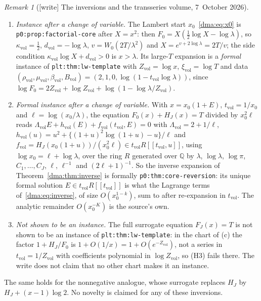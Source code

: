 \documentclass[11pt,letterpaper]{article}
\theoremstyle{remark}\newtheorem{remark}[theorem]{Remark}
\newcommand{\file}[1]{\nolinkurl{#1}}
\begin{document}
\begin{remark}[{[write]} The inversions and the transseries volume, 7~October 2026]
\begin{enumerate}[label=(\alph*)]
 most $\delta_J(x)$ for a suitable $C_J$; \file{p0:thm:staircase}(1) and the
 monotonicity of the ceiling give~\eqref{dma:eq:ceiling} for large $T$. Since
 $\nu_{\mathcal A}(\log a_n)=n$, the same bound gives the threshold-sample
 assertion, and \file{p0:thm:staircase}(3) adds that
 $n=\lfloor x_J(\log a_n)+\tfrac12\rfloor$ for all large $n$, which the source
 does not state.
\item \emph{Instance after a change of variable.} The Lambert start
 $x_0$~\eqref{dma:eq:x0} is \file{p0:prop:factorial-core} after $X=x^2$: then
 $F_0=X(\tfrac12\log X-\log\lambda)$, so $\kappa_{\mathrm{vol}}=\tfrac12$,
 $d_{\mathrm{vol}}=-\log\lambda$, $v=W_0(2T/\lambda^2)$ and
 $X=e^{v+2\log\lambda}=2T/v$; the side condition
 $\kappa_{\mathrm{vol}}\log X+d_{\mathrm{vol}}>0$ is $x>\lambda$. Its large-$T$
 expansion is a \emph{formal} instance of \file{plt:thm:lw-template} with
 $Z_{\mathrm{vol}}=\log x$, $\xi_{\mathrm{vol}}=\log T$ and data
 $(\rho_{\mathrm{vol}},\mu_{\mathrm{vol}},\beta_{\mathrm{vol}},B_{\mathrm{vol}})=(2,1,0,\log(1-t_{\mathrm{vol}}\log\lambda))$,
 since $\log F_0=2Z_{\mathrm{vol}}+\log Z_{\mathrm{vol}}+\log(1-\log\lambda/Z_{\mathrm{vol}})$.
\item \emph{Formal instance after a change of variable.} With $x=x_0(1+E)$,
 $t_{\mathrm{vol}}=1/x_0$ and $\ell=\log(x_0/\lambda)$, the equation
 $F_0(x)+H_J(x)=T$ divided by $x_0^2\ell$ reads
 $\Lambda_{\mathrm{vol}}E+h_{\mathrm{vol}}(E)+f_{\mathrm{vol}}(t_{\mathrm{vol}},E)=0$
 with $\Lambda_{\mathrm{vol}}=2+1/\ell$,
 $h_{\mathrm{vol}}(u)=u^2+\{(1+u)^2\log(1+u)-u\}/\ell$ and
 $f_{\mathrm{vol}}=H_J(x_0(1+u))/(x_0^2\ell)\in t_{\mathrm{vol}}R[[t_{\mathrm{vol}},u]]$,
 using $\log x_0=\ell+\log\lambda$, over the ring $R$ generated over
 $\mathbb Q$ by $\lambda$, $\log\lambda$, $\log\pi$, $C_1,\dots,C_J$, $\ell$, $\ell^{-1}$ and
 $(2\ell+1)^{-1}$. So the inverse expansion of
 Theorem~\ref{dma:thm:inverse} is formally \file{p0:thm:core-reversion}: its
 unique formal solution $E\in t_{\mathrm{vol}}R[[t_{\mathrm{vol}}]]$ is what the
 Lagrange terms of~\eqref{dma:eq:inverse}, of size $O(x_0^{1-k})$, sum to
 after re-expansion in $t_{\mathrm{vol}}$. The analytic remainder
 $O(x_0^{-K})$ is the source's own.
\item \emph{Not shown to be an instance.} The full surrogate equation
 $F_J(x)=T$ is not shown to be an instance of \file{plt:thm:lw-template}: in
 the chart of (c) the factor $1+H_J/F_0$ is $1+O(1/x)=1+O(e^{-Z_{\mathrm{vol}}})$,
 not a series in $t_{\mathrm{vol}}=1/Z_{\mathrm{vol}}$ with coefficients
 polynomial in $\log Z_{\mathrm{vol}}$, so (H3) fails there. The write does not
 claim that no other chart makes it an instance.
\end{enumerate}
The same holds for the nonnegative analogue, whose surrogate replaces $H_J$
by $H_J+(x-1)\log2$. No novelty is claimed for any of these inversions.
\end{remark}
\end{document}
